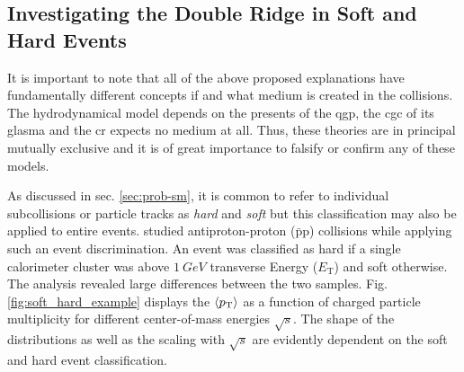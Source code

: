 \subsection{Investigating the Double Ridge in Soft and Hard Events}
\label{sec:hard-soft}

It is important to note that all of the above proposed explanations have fundamentally different concepts if and what medium is created in the collisions. The hydrodynamical model depends on the presents of the \gls{qgp}, the \gls{cgc} of its glasma and the \gls{cr} expects no medium at all. Thus, these theories are in principal mutually exclusive and it is of great importance to falsify or confirm any of these models. 

As discussed in sec. \ref{sec:prob-sm}, it is common to refer to individual subcollisions or particle tracks as \emph{hard} and \emph{soft} but this classification may also be applied to entire events. \cite{Acosta2002} studied antiproton-proton ($\bar{\text{p}}\text{p}$) collisions while applying such an event discrimination. An event was classified as hard if a single calorimeter cluster was above $\SI{1}{GeV}$ transverse Energy ($E_{\text{T}}$) and soft otherwise. The analysis revealed large differences between the two samples. Fig. \ref{fig:soft_hard_example} displays the $\left< p_{\text{T}} \right>$ as a function of charged particle multiplicity for different center-of-mass energies $\sqrt{s}$. The shape of the distributions as well as the scaling with $\sqrt{s}$ are evidently dependent on the soft and hard event classification.
